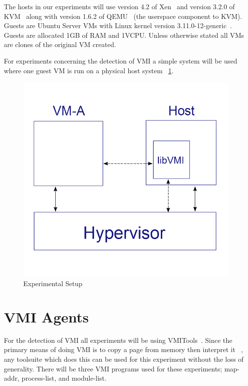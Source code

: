 	The hosts in our experiments will use version 4.2 of Xen~\cite{barham_xen_2003} and version 3.2.0 of KVM ~\cite{kivity_kvm:_2007}along with version 1.6.2 of QEMU~\cite{bellard_qemu_2005} (the userspace component to KVM). Guests are Ubuntu Server VMs with Linux kernel version 3.11.0-12-generic~\cite{_Linux_archive}. Guests are allocated 1GB of RAM and 1VCPU. Unless otherwise stated all VMs are clones of the original VM created. 

	For experiments concerning the detection of VMI a simple system will be used where one guest VM is run on a physical host system ~\ref{ExpApp}. 

	\begin{figure}\label{ExpApp}
	  \centering
	  \includegraphics[width=\textwidth]{figures/BM_graph3_cropped.png}
	  \caption{Experimental Setup}
	\end{figure}

\section{VMI Agents}
For the detection of VMI all experiments will be using VMITools~\cite{payne_vmitools_2014}. Since the primary means of doing VMI is to copy a page from memory then interpret it ~\cite{payne_vmitools_2014, hay_forensics_2008, more_dynamic_2013, dolan-gavitt_leveraging_2011}, any toolsuite which does this can be used for this experiment without the loss of generality. There will be three VMI programs used for these experiments; map-addr, process-list, and module-list. 

